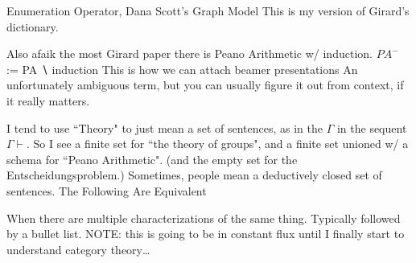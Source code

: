 \documentclass[
	fontsize=10pt, %
	twoside=false, %
	secnumdepth=-1, %
]{kaobook}
\theoremstyle{break}
\begin{document}
    \See Enumeration Operator, Dana Scott's Graph Model
    This is my version of Girard's dictionary.

    Also afaik the most Girard paper there is
    Peano Arithmetic w/ induction.
    $PA^-$ := PA ∖ induction
    This is how we can attach beamer presentations
    An unfortunately ambiguous term,
    but you can usually figure it out from context,
    if it really matters.

    I tend to use ``Theory" to just mean a set of sentences,
    as in the $Γ$ in the sequent $Γ ⊢ $.
    So I see a finite set for ``the theory of groups",
    and a finite set unioned w/ a schema for ``Peano Arithmetic".
    (and the empty set for the Entscheidungsproblem.)
    Sometimes, people mean a deductively closed set of sentences.
    The Following Are Equivalent

    When there are multiple characterizations of the same thing.
    Typically followed by a bullet list.
    NOTE: this is going to be in constant flux until I finally start to understand category theory…
\end{document}
